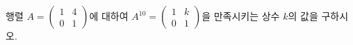행렬 $A=\begin{pmatrix} 1 & 4 \\ 0 & 1 \end{pmatrix}$에 대하여 $A^{10}=\begin{pmatrix} 1 & k \\ 0 & 1 \end{pmatrix}$을 만족시키는 상수 $k$의 값을 구하시오.
